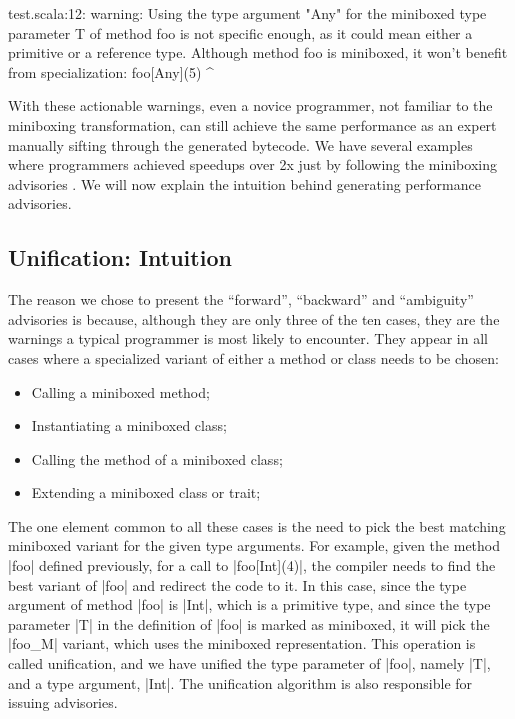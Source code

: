 \begin{lstlisting-nobreak-nolang}
test.scala:12: warning: Using the type argument "Any" for the miniboxed type parameter T of method foo is not specific enough, as it could mean either a primitive or a reference type. Although method foo is miniboxed, it won't benefit from specialization:
              foo[Any](5)
                   ^
\end{lstlisting-nobreak-nolang}

With these actionable warnings, even a novice programmer, not familiar to the miniboxing transformation, can still achieve the same performance as an expert manually sifting through the generated bytecode. We have several examples where programmers achieved speedups over 2x just by following the miniboxing advisories \cite{miniboxing-www,tixxit-respecialization6,pnwscala-pureimage}. We will now explain the intuition behind generating performance advisories.

\subsection{Unification: Intuition}

The reason we chose to present the ``forward'', ``backward'' and ``ambiguity'' advisories is because, although they are only three of the ten cases, they are the warnings a typical programmer is most likely to encounter. They appear in all cases where a specialized variant of either a method or class needs to be chosen:

\begin{itemize}
 \item Calling a miniboxed method;
 \item Instantiating a miniboxed class;
 \item Calling the method of a miniboxed class;
 \item Extending a miniboxed class or trait;
\end{itemize}

The one element common to all these cases is the need to pick the best matching miniboxed variant for the given type arguments. For example, given the method |foo| defined previously, for a call to |foo[Int](4)|, the compiler needs to find the best variant of |foo| and redirect the code to it. In this case, since the type argument of method |foo| is |Int|, which is a primitive type, and since the type parameter |T| in the definition of |foo| is marked as miniboxed, it will pick the |foo_M| variant, which uses the miniboxed representation. This operation is called unification, and we have unified the type parameter of |foo|, namely |T|, and a type argument, |Int|. The unification algorithm is also responsible for issuing advisories.

